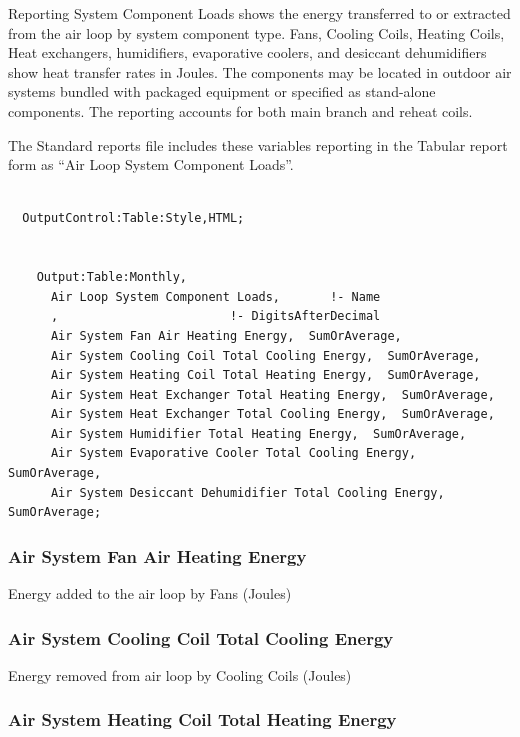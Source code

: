 Reporting System Component Loads shows the energy transferred to or extracted from the air loop by system component type. Fans, Cooling Coils, Heating Coils, Heat exchangers, humidifiers, evaporative coolers, and desiccant dehumidifiers show heat transfer rates in Joules. The components may be located in outdoor air systems bundled with packaged equipment or specified as stand-alone components. The reporting accounts for both main branch and reheat coils.

The Standard reports file includes these variables reporting in the Tabular report form as ``Air Loop System Component Loads''.

\begin{lstlisting}

  OutputControl:Table:Style,HTML;


    Output:Table:Monthly,
      Air Loop System Component Loads,       !- Name
      ,                        !- DigitsAfterDecimal
      Air System Fan Air Heating Energy,  SumOrAverage,
      Air System Cooling Coil Total Cooling Energy,  SumOrAverage,
      Air System Heating Coil Total Heating Energy,  SumOrAverage,
      Air System Heat Exchanger Total Heating Energy,  SumOrAverage,
      Air System Heat Exchanger Total Cooling Energy,  SumOrAverage,
      Air System Humidifier Total Heating Energy,  SumOrAverage,
      Air System Evaporative Cooler Total Cooling Energy,  SumOrAverage,
      Air System Desiccant Dehumidifier Total Cooling Energy,  SumOrAverage;
\end{lstlisting}

\subsubsection{Air System Fan Air Heating Energy}\label{air-system-fan-air-heating-energy}

Energy added to the air loop by Fans (Joules)

\subsubsection{Air System Cooling Coil Total Cooling Energy}\label{air-system-cooling-coil-total-cooling-energy}

Energy removed from air loop by Cooling Coils (Joules)

\subsubsection{Air System Heating Coil Total Heating Energy}\label{air-system-heating-coil-total-heating-energy}

